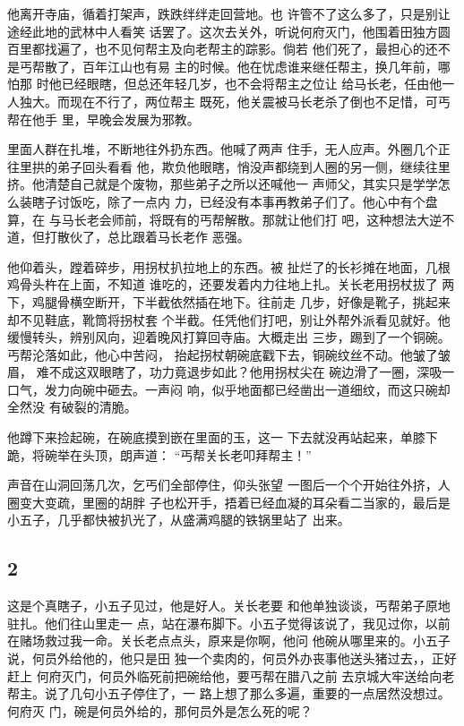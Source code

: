 他离开寺庙，循着打架声，跌跌绊绊走回营地。也
许管不了这么多了，只是别让途经此地的武林中人看笑
话罢了。这次去关外，听说何府灭门，他围着田独方圆
百里都找遍了，也不见何帮主及向老帮主的踪影。倘若
他们死了，最担心的还不是丐帮散了，百年江山也有易
主的时候。他在忧虑谁来继任帮主，换几年前，哪怕那
时他已经眼瞎，但总还年轻几岁，也不会将帮主之位让
给马长老，任由他一人独大。而现在不行了，两位帮主
既死，他关震被马长老杀了倒也不足惜，可丐帮在他手
里，早晚会发展为邪教。

里面人群在扎堆，不断地往外扔东西。他喊了两声
住手，无人应声。外圈几个正往里拱的弟子回头看看
他，欺负他眼瞎，悄没声都绕到人圈的另一侧，继续往里
挤。他清楚自己就是个废物，那些弟子之所以还喊他一
声师父，其实只是学学怎么装瞎子讨饭吃，除了一点内
力，已经没有本事再教弟子们了。他心中有个盘算，在
与马长老会师前，将既有的丐帮解散。那就让他们打
吧，这种想法大逆不道，但打散伙了，总比跟着马长老作
恶强。

他仰着头，蹚着碎步，用拐杖扒拉地上的东西。被
扯烂了的长衫摊在地面，几根鸡骨头杵在上面，不知道
谁吃的，还要发着内力往地上扎。关长老用拐杖拔了
两下，鸡腿骨横空断开，下半截依然插在地下。往前走
几步，好像是靴子，挑起来却不见鞋底，靴筒将拐杖套
个半截。任凭他们打吧，别让外帮外派看见就好。他
缓慢转头，辨别风向，迎着晚风打算回寺庙。大概走出
三步，踢到了一个铜碗。丐帮沦落如此，他心中苦闷，
抬起拐杖朝碗底戳下去，铜碗纹丝不动。他皱了皱眉，
难不成这双眼瞎了，功力竟退步如此？他用拐杖尖在
碗边滑了一圈，深吸一口气，发力向碗中砸去。一声闷
响，似乎地面都已经凿出一道细纹，而这只碗却全然没
有破裂的清脆。

他蹲下来捡起碗，在碗底摸到嵌在里面的玉，这一
下去就没再站起来，单膝下跪，将碗举在头顶，朗声道：
“丐帮关长老叩拜帮主！”

声音在山洞回荡几次，乞丐们全部停住，仰头张望
一图后一个个开始往外挤，人圈变大变疏，里圈的胡胖
子也松开手，捂着已经血凝的耳朵看二当家的，最后是
小五子，几乎都快被扒光了，从盛满鸡腿的铁锅里站了
出来。
\newline

{\centering\subsection{2}}

这是个真瞎子，小五子见过，他是好人。关长老要
和他单独谈谈，丐帮弟子原地驻扎。他们往山里走一
点，站在瀑布脚下。小五子觉得该说了，我见过你，以前
在赌场救过我一命。关长老点点头，原来是你啊，他问
他碗从哪里来的。小五子说，何员外给他的，他只是田
独一个卖肉的，何员外办丧事他送头猪过去，，正好赶上
何府灭门，何员外临死前把碗给他，要丐帮在腊八之前
去京城大牢送给向老帮主。说了几句小五子停住了，一
路上想了那么多遍，重要的一点居然没想过。何府灭
门，碗是何员外给的，那何员外是怎么死的呢？

